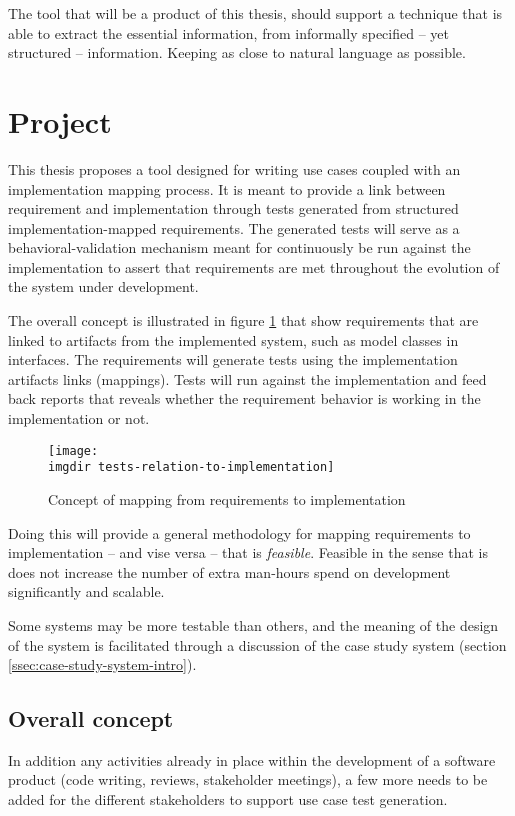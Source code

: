 \noindent The tool that will be a product of this thesis, should support a technique that is able to extract the essential information, from informally specified -- yet structured -- information. Keeping as close to natural language as possible.

\section{Project}
This thesis proposes a tool designed for writing use cases coupled with an implementation mapping process. It is meant to provide a link between requirement and implementation through tests generated from structured implementation-mapped requirements. The generated tests will serve as a behavioral-validation mechanism meant for continuously be run against the implementation to assert that requirements are met throughout the evolution of the system under development.\medskip

\noindent The overall concept is illustrated in figure \ref{fig:tests-relation-to-implementation} that show requirements that are linked to artifacts from the implemented system, such as model classes in interfaces. The requirements will generate tests using the implementation artifacts links (mappings). Tests will run against the implementation and feed back reports that reveals whether the requirement behavior is working in the implementation or not.\medskip
\begin{figure}[!htbp]
\centering
\texttt{[image: \\imgdir tests-relation-to-implementation]}
\caption{Concept of mapping from requirements to implementation}
\label{fig:tests-relation-to-implementation}
\end{figure}

\noindent Doing this will provide a general methodology for mapping requirements to implementation -- and vise versa -- that is \emph{feasible}. Feasible in the sense that is does not increase the number of extra man-hours spend on development significantly and scalable.\medskip

\noindent Some systems may be more testable than others, and the meaning of the design of the system is facilitated through a discussion of the case study system (section \ref{ssec:case-study-system-intro}).


\subsection{Overall concept}
In addition any activities already in place within the development of a software product (code writing, reviews, stakeholder meetings), a few more needs to be added for the different stakeholders to support use case test generation.\medskip

